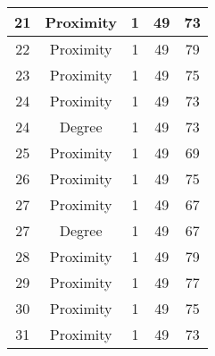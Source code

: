 \documentclass[results.tex]{subfiles}
\begin{document}
\begin{center}
\begin{tabular}{| c || c | c | c | c |}
            \hline
            21                      & Proximity                    & 1                      & 49                      & 73                   \\
            \hline
            22                      & Proximity                    & 1                      & 49                      & 79                   \\
            \hline
            23                      & Proximity                    & 1                      & 49                      & 75                   \\
            \hline
            24                      & Proximity                    & 1                      & 49                      & 73                   \\
            \hline
            24                      & Degree                       & 1                      & 49                      & 73                   \\
            \hline
            25                      & Proximity                    & 1                      & 49                      & 69                   \\
            \hline
            26                      & Proximity                    & 1                      & 49                      & 75                   \\
            \hline
            27                      & Proximity                    & 1                      & 49                      & 67                   \\
            \hline
            27                      & Degree                       & 1                      & 49                      & 67                   \\
            \hline
            28                      & Proximity                    & 1                      & 49                      & 79                   \\
            \hline
            29                      & Proximity                    & 1                      & 49                      & 77                   \\
            \hline
            30                      & Proximity                    & 1                      & 49                      & 75                   \\
            \hline
            31                      & Proximity                    & 1                      & 49                      & 73                   \\

\end{tabular}
\end{center}
\end{document}
